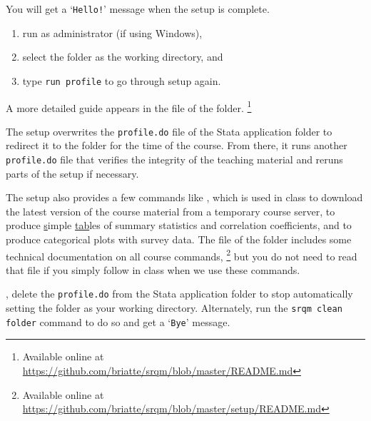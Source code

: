	You will get a `\texttt{Hello!}' message when the setup is complete.%
	
		\begin{enumerate}
			\item run as administrator (if using Windows),
			\item select the \SRQM folder as the working directory, and
			\item type \texttt{run profile} to go through setup again.
		\end{enumerate}
	
	A more detailed guide appears in the \README file of the \SRQM folder.%
    \footnote{Available online at \url{https://github.com/briatte/srqm/blob/master/README.md}}%
  
	The setup overwrites the \texttt{profile.do} file of the Stata application folder to redirect it to the \SRQM folder for the time of the course. From there, it runs another \texttt{profile.do} file that verifies the integrity of the teaching material and reruns parts of the setup if necessary.%
		
	The setup also provides a few commands like , which is used in class to download the latest version of the course material from a temporary course server,  to produce \underline{s}imple \underline{tab}les of summary statistics and correlation coefficients, and  to produce categorical plots with survey data. %
		The \README file of the \setup folder includes some technical documentation on all course commands,%
	  \footnote{Available online at %
			\url{https://github.com/briatte/srqm/blob/master/setup/README.md}} %
		but you do not need to read that file if you simply follow in class when we use these commands.%
		
  , delete the \texttt{profile.do} from the Stata application folder to stop automatically setting the \SRQM folder as your working directory. Alternately, run the \texttt{srqm clean folder} command to do so and get a `\texttt{Bye}' message.%
